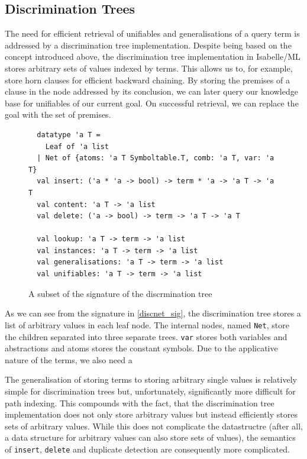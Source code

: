 \subsection{Discrimination Trees}
The need for efficient retrieval of unifiables and generalisations of a query term is addressed by a discrimination tree implementation. Despite being based on the concept introduced above, the discrimination tree implementation in Isabelle/ML stores arbitrary sets of values indexed by terms. This allows us to, for example, store horn clauses for efficient backward chaining. By storing the premises of a clause in the node addressed by its conclusion, we can later query our knowledge base for unifiables of our current goal. On successful retrieval, we can replace the goal with the set of premises.

\begin{figure}[h]
\begin{lstlisting}
  datatype 'a T =
    Leaf of 'a list
  | Net of {atoms: 'a T Symboltable.T, comb: 'a T, var: 'a T}
  val insert: ('a * 'a -> bool) -> term * 'a -> 'a T -> 'a T
  val content: 'a T -> 'a list
  val delete: ('a -> bool) -> term -> 'a T -> 'a T

  val lookup: 'a T -> term -> 'a list
  val instances: 'a T -> term -> 'a list
  val generalisations: 'a T -> term -> 'a list
  val unifiables: 'a T -> term -> 'a list
\end{lstlisting}
\caption{A subset of the signature of the discrmination tree}
\end{figure} \label{discnet_sig}

As we can see from the signature in \ref{discnet_sig}, the discrimination tree stores a list of arbitrary values in each leaf node. The internal nodes, named \verb!Net!, store the children separated into three separate trees. \verb!var! stores both variables and abstractions and atoms stores the constant symbols. Due to the applicative nature of the terms, we also need a 



The generalisation of storing terms to storing arbitrary single values is relatively simple for discrimination trees but, unfortunately, significantly more difficult for path indexing. This compounds with the fact, that the discrimination tree implementation does not only store arbitrary values but instead efficiently stores sets of arbitrary values. While this does not complicate the datastructre (after all, a data structure for arbitrary values can also store sets of values), the semantics of \verb!insert!, \verb!delete! and duplicate detection are consequently more complicated.

